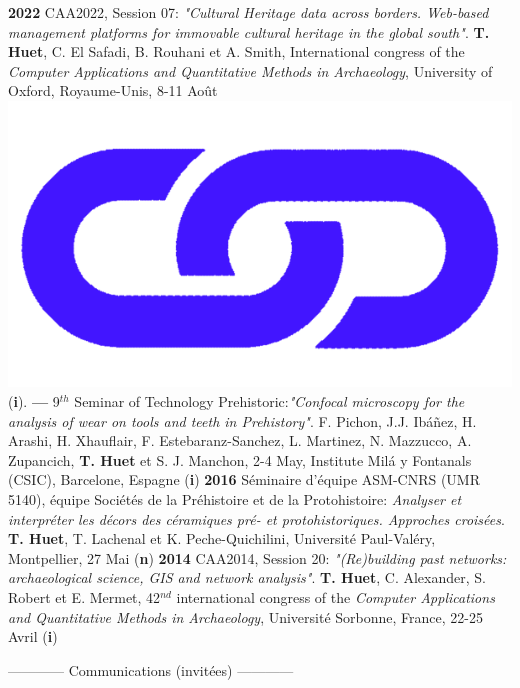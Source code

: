 \documentclass{article}
\begin{document}
\textbf{2022 }CAA2022, Session 07: \textit{"Cultural Heritage data across borders. Web-based management platforms for immovable cultural heritage in the global south"}. \textbf{T. Huet}, C. El Safadi, B. Rouhani et A. Smith, International congress of the \textit{Computer Applications and Quantitative Methods in Archaeology}, University of Oxford, Royaume-Unis, 8-11 Août \href{https://eamena-project.github.io/reveal.js/projects/caa22s07.html}{\includegraphics[scale=0.02]{link_darkblue.png}} (\textbf{i}). 
\smallbreak
\textbf{--- }9${}^{th}$ Seminar of Technology Prehistoric:\textit{"Confocal microscopy for the analysis of wear on tools and teeth in Prehistory"}. F. Pichon, J.J. Ibáñez, H. Arashi, H. Xhauflair, F. Estebaranz-Sanchez, L. Martinez, N. Mazzucco, A. Zupancich, \textbf{T. Huet} et S. J. Manchon, 2-4 May, Institute Milá y Fontanals (CSIC), Barcelone, Espagne (\textbf{i})
\smallbreak
\textbf{2016 }S\'{e}minaire d'\'{e}quipe ASM-CNRS (UMR 5140), \'{e}quipe Soci\'{e}t\'{e}s de la Pr\'{e}histoire et de la Protohistoire: \textit{Analyser et interpr\'{e}ter les d\'{e}cors des c\'{e}ramiques pr\'{e}- et protohistoriques. Approches crois\'{e}es}. \textbf{T. Huet}, T. Lachenal et K. Peche-Quichilini, Universit\'{e} Paul-Val\'{e}ry, Montpellier, 27 Mai (\textbf{n})
\smallbreak
\textbf{2014 }CAA2014, Session 20: \textit{"(Re)building past networks: archaeological science, GIS and network analysis"}. \textbf{T. Huet}, C. Alexander, S. Robert et E. Mermet, 42${}^{nd}$ international congress of the \textit{Computer Applications and Quantitative Methods in Archaeology}, Universit\'{e} Sorbonne, France, 22-25 Avril (\textbf{i})
\bigbreak

\begin{center}------------ Communications (invit\'{e}es) ------------\end{center}
\smallbreak
\end{document}
